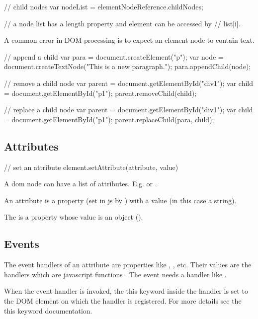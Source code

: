 \begin{js}
  // child nodes
  var nodeList = elementNodeReference.childNodes;

  // a node list has a length property and element can be accessed by
  // list[i].
\end{js}

A common error in DOM processing is to expect an element node to contain text.

\begin{js}
  // append a child
  var para = document.createElement("p");
  var node = document.createTextNode("This is a new paragraph.");
  para.appendChild(node);

  // remove a child node
  var parent = document.getElementById("div1");
  var child = document.getElementById("p1");
  parent.removeChild(child);

  // replace a child node
  var parent = document.getElementById("div1");
  var child = document.getElementById("p1");
  parent.replaceChild(para, child);
\end{js}

\subsection{Attributes}


\begin{js}
  // set an attribute
  element.setAttribute(attribute, value)
\end{js}

A dom node can have a list of attributes. E.g.  or .

An attribute is a property (set in js by ) with
a value (in this case a string).

The  is a property whose value is an object
().



\subsection{Events}

The event handlers of an attribute are properties like ,
, etc. Their values are the handlers which are javascript
functions . The event  needs a handler
like .


When the event handler is invoked, the this keyword inside the handler is set
to the DOM element on which the handler is registered. For more details see
the this keyword documentation.

